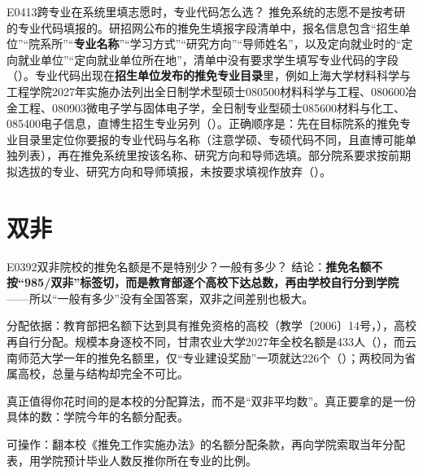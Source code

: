 \begin{qa}{E0413}{跨专业在系统里填志愿时，专业代码怎么选？}
推免系统的志愿不是按考研的专业代码填报的。研招网公布的推免生填报字段清单中，报名信息包含“招生单位”“院系所”“\textbf{专业名称}”“学习方式”“研究方向”“导师姓名”，以及定向就业时的“定向就业单位”“定向就业单位所在地”，清单中没有要求学生填写专业代码的字段（）。专业代码出现在\textbf{招生单位发布的推免专业目录}里，例如上海大学材料科学与工程学院2027年实施办法列出全日制学术型硕士080500材料科学与工程、080600冶金工程、080903微电子学与固体电子学，全日制专业型硕士085600材料与化工、085400电子信息，直博生招生专业另列（）。正确顺序是：先在目标院系的推免专业目录里定位你要报的专业代码与名称（注意学硕、专硕代码不同，且直博可能单独列表），再在推免系统里按该名称、研究方向和导师选填。部分院系要求按前期拟选拔的专业、研究方向和导师填报，未按要求填视作放弃（）。
\end{qa}

\section{双非}
\begin{qa}{E0392}{双非院校的推免名额是不是特别少？一般有多少？}
结论：\textbf{推免名额不按“985/双非”标签切，而是教育部逐个高校下达总数，再由学校自行分到学院}——所以“一般有多少”没有全国答案，双非之间差别也极大。

分配依据：教育部把名额下达到具有推免资格的高校（教学〔2006〕14号，），高校再自行分配。规模本身逐校不同，甘肃农业大学2027年全校名额是433人（），而云南师范大学一年的推免名额里，仅“专业建设奖励”一项就达226个（）；两校同为省属高校，总量与结构却完全不可比。

真正值得你花时间的是本校的分配算法，而不是“双非平均数”。真正要拿的是一份具体的数：学院今年的名额分配表。

可操作：翻本校《推免工作实施办法》的名额分配条款，再向学院索取当年分配表，用学院预计毕业人数反推你所在专业的比例。
\end{qa}

